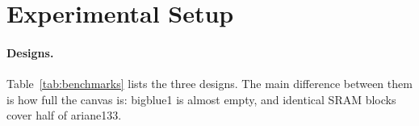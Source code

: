 \documentclass[10pt]{article}
\begin{document}
\section{Experimental Setup}\label{sec:setup}

\begin{table}[tbp]
\centering
\caption{Designs. On each design, the first 128 macros are placed on a $224\times224$ grid. Policies are trained on adaptec1. bigblue1 and ariane133 are used only to test transfer.}
\label{tab:benchmarks}
\small

\end{table}

\paragraph{Designs.} Table~\ref{tab:benchmarks} lists the three designs. The main difference between them is how full the canvas is: bigblue1 is almost empty, and identical SRAM blocks cover half of ariane133.
\end{document}
